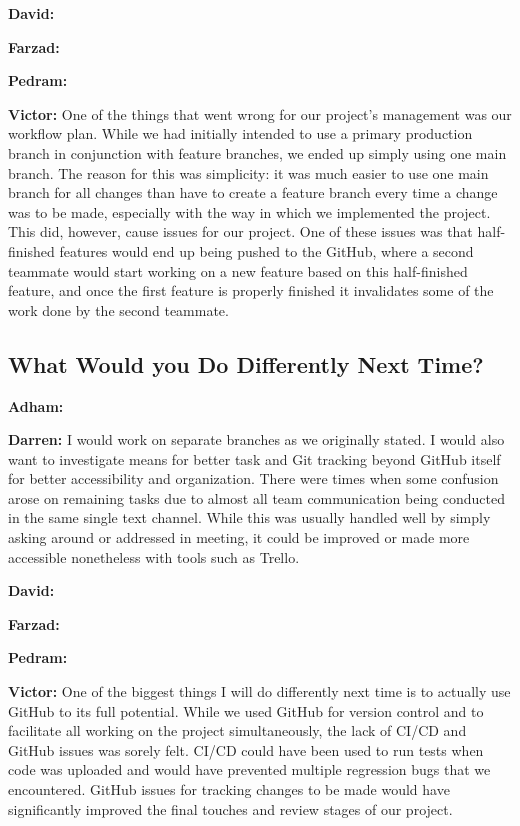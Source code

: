 \documentclass{article}
\begin{document}
\textbf{David:}

\textbf{Farzad:}

\textbf{Pedram:}

\textbf{Victor:} One of the things that went wrong for our project's management was our workflow plan. While we had initially intended to use a primary production branch in conjunction with feature branches, we ended up simply using one main branch. The reason for this was simplicity: it was much easier to use one main branch for all changes than have to create a feature branch every time a change was to be made, especially with the way in which we implemented the project. This did, however, cause issues for our project. One of these issues was that half-finished features would end up being pushed to the GitHub, where a second teammate would start working on a new feature based on this half-finished feature, and once the first feature is properly finished it invalidates some of the work done by the second teammate.

\subsection{What Would you Do Differently Next Time?}

\textbf{Adham:}

\textbf{Darren:} I would work on separate branches as we originally stated. I would also want to investigate means for better task and Git tracking beyond GitHub itself for better accessibility and organization. There were times when some confusion arose on remaining tasks due to almost all team communication being conducted in the same single text channel. While this was usually handled well by simply asking around or addressed in meeting, it could be improved or made more accessible nonetheless with tools such as Trello.

\textbf{David:}

\textbf{Farzad:}

\textbf{Pedram:}

\textbf{Victor:} One of the biggest things I will do differently next time is to actually use GitHub to its full potential. While we used GitHub for version control and to facilitate all working on the project simultaneously, the lack of CI/CD and GitHub issues was sorely felt. CI/CD could have been used to run tests when code was uploaded and would have prevented multiple regression bugs that we encountered. GitHub issues for tracking changes to be made would have significantly improved the final touches and review stages of our project.
\end{document}
